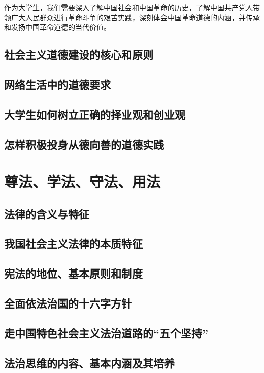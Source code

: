 作为大学生，我们需要深入了解中国社会和中国革命的历史，了解中国共产党人带领广大人民群众进行革命斗争的艰苦实践，深刻体会中国革命道德的内涵，并传承和发扬中国革命道德的当代价值。

\subsection{社会主义道德建设的核心和原则}
\subsection{网络生活中的道德要求}
\subsection{大学生如何树立正确的择业观和创业观}
\subsection{怎样积极投身从德向善的道德实践}

\section{尊法、学法、守法、用法}
\subsection{法律的含义与特征}
\subsection{我国社会主义法律的本质特征}
\subsection{宪法的地位、基本原则和制度}
\subsection{全面依法治国的十六字方针}
\subsection{走中国特色社会主义法治道路的“五个坚持”}
\subsection{法治思维的内容、基本内涵及其培养}

